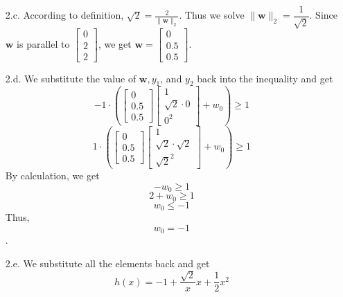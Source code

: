 \documentclass[12pt]{article}
\begin{document}
\begin{itemize}

\item[2.c. ] \smallskip According to definition, $  \sqrt{2} = \frac{2}{\|\textbf{w}\|_{2}}$. Thus we solve $\|\textbf{w}\|_{2} = \dfrac{1}{\sqrt{2}}$. Since $\textbf{w}$ is parallel to $\left[\begin{array}{c} 
0 \\ 2 \\ 2
\end{array}\right]$, we get $\textbf{w} = \left[\begin{array}{c} 
0 \\ 0.5 \\ 0.5
\end{array}\right]$.


\end{itemize}

\begin{itemize}

\item[2.d. ] \smallskip We substitute the value of $\textbf{w}, y_1$, and $y_2$ back into the inequality and get $$ -1 \cdot ( \left[\begin{array}{c} 
0 \\ 0.5 \\ 0.5
\end{array}\right] 
\left[\begin{array}{c} 
1 \\ \sqrt{2}\cdot0 \\ 0^2
\end{array}\right]+w_0) \geq 1$$
$$ 1 \cdot ( \left[\begin{array}{c} 
0 \\ 0.5 \\ 0.5
\end{array}\right] 
\left[\begin{array}{c} 
1 \\ \sqrt{2} \cdot \sqrt{2} \\ \sqrt{2}^2
\end{array}\right]+w_0) \geq 1$$
By calculation, we get $$ -w_0 \geq 1$$ $$2+w_0\geq1$$ $$w_0\leq-1$$ Thus, $$w_0=-1$$.

\end{itemize}

\begin{itemize}

\item[2.e. ] \smallskip We substitute all the elements back and get $$h(x) = -1 + \frac{\sqrt{2}}{x}x + \frac{1}{2}x^2$$



\end{itemize}
\end{document}
